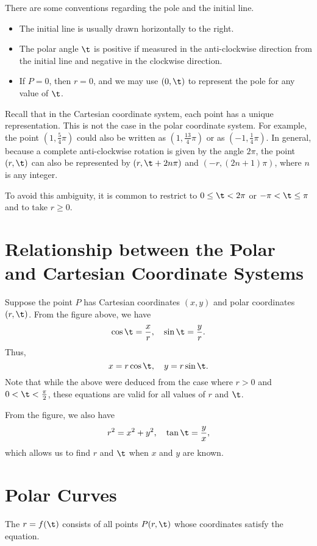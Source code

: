 There are some conventions regarding the pole and the initial line.
\begin{itemize}
    \item The initial line is usually drawn horizontally to the right.
    \item The polar angle $\t$ is positive if measured in the anti-clockwise direction from the initial line and negative in the clockwise direction.
    \item If $P = 0$, then $r = 0$, and we may use $(0, \t)$ to represent the pole for any value of $\t$.
\end{itemize}

Recall that in the Cartesian coordinate system, each point has a unique representation. This is not the case in the polar coordinate system. For example, the point $(1, \frac54 \pi)$ could also be written as $(1, \frac{13}{4} \pi)$ or as $(-1, \frac14 \pi)$. In general, because a complete anti-clockwise rotation is given by the angle $2\pi$, the point $(r, \t)$ can also be represented by $(r, \t + 2n\pi)$ and $(-r, (2n + 1)\pi)$, where $n$ is any integer.

To avoid this ambiguity, it is common to restrict to $0 \leq \t < 2\pi$ or $-\pi < \t \leq \pi$ and to take $r \geq 0$.

\section{Relationship between the Polar and Cartesian Coordinate Systems}

Suppose the point $P$ has Cartesian coordinates $(x, y)$ and polar coordinates $(r, \t)$. From the figure above, we have \[\cos \t = \frac{x}{r}, \quad \sin \t = \frac{y}{r}.\] Thus, \[x = r\cos \t, \quad y = r\sin\t.\] Note that while the above were deduced from the case where $r > 0$ and $0 < \t < \frac\pi2$, these equations are valid for all values of $r$ and $\t$.

From the figure, we also have \[r^2 = x^2 + y^2, \quad \tan \t = \frac{y}{x},\] which allows us to find $r$ and $\t$ when $x$ and $y$ are known.

\section{Polar Curves}

\begin{definition}
    The  $r = f(\t)$ consists of all points $P(r, \t)$ whose coordinates satisfy the equation.
\end{definition}

